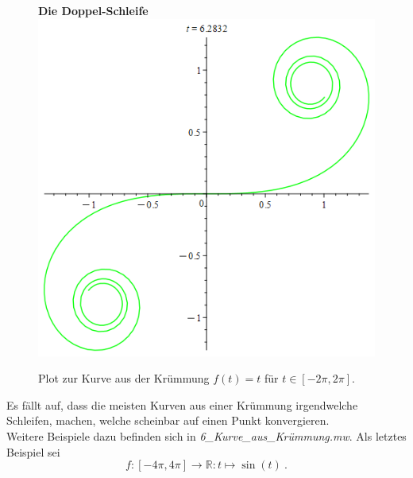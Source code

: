 \documentclass[12pt]{article}
\newenvironment{Fig}{\begin{figure}[H]
\begin{center}}{\end{center}\end{figure}}
\begin{document}
\begin{Fig}
\textbf{Die Doppel-Schleife}\\
\includegraphics[scale=0.25]{Kurve zu t.png}
\caption{Plot zur Kurve aus der Krümmung $f(t) = t$ für $t \in [-2\pi,2\pi]$.}
\label{fig:Die Doppel-Schleife}
\end{Fig}
Es fällt auf, dass die meisten Kurven aus einer Krümmung irgendwelche Schleifen, machen, welche scheinbar auf einen Punkt konvergieren.\\
Weitere Beispiele dazu befinden sich in \textit{6\_Kurve\_aus\_Krümmung.mw}. Als letztes Beispiel sei
\[f: [-4\pi,4\pi] \rightarrow \mathbb{R}: t \mapsto \sin(t)~.\]
\end{document}
